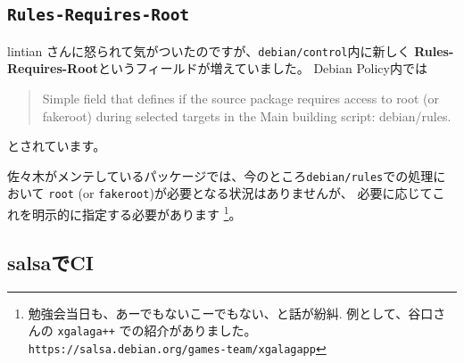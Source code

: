 \documentclass[mingoth,a4paper]{jsarticle}
\begin{document}
\subsection{\texttt{Rules-Requires-Root}}

lintian さんに怒られて気がついたのですが、\texttt{debian/control}内に新しく
\textbf{Rules-Requires-Root}というフィールドが増えていました。
Debian Policy内では
\begin{quote}
  Simple field that defines if the source package requires access to
  root (or fakeroot) during selected targets in the Main building
  script: debian/rules.
\end{quote}
とされています。

佐々木がメンテしているパッケージでは、今のところ\texttt{debian/rules}での処理において
\texttt{root} (or \texttt{fakeroot})が必要となる状況はありませんが、
必要に応じてこれを明示的に指定する必要があります%
\footnote{%
  勉強会当日も、あーでもないこーでもない、と話が紛糾.
  例として、谷口さんの \texttt{xgalaga++} での紹介がありました。
  \\
  \@see \texttt{https://salsa.debian.org/games-team/xgalagapp}
}。

\subsection{salsaでCI}
\end{document}
